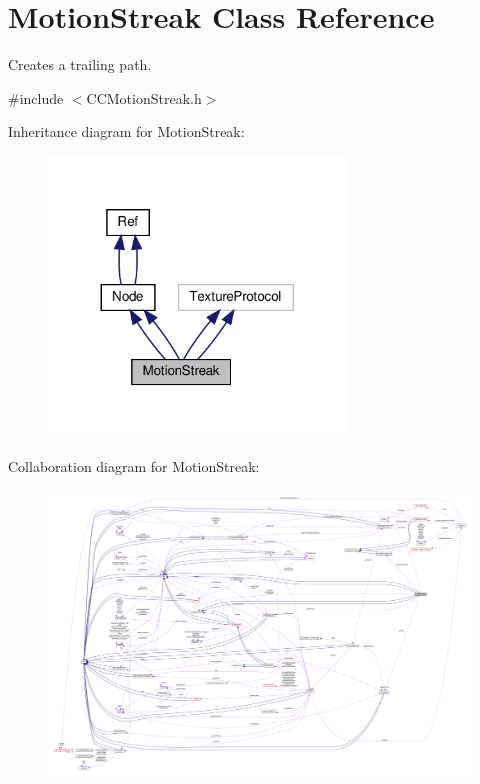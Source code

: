 \hypertarget{classMotionStreak}{}\section{Motion\+Streak Class Reference}
\label{classMotionStreak}


Creates a trailing path.  




{\ttfamily \#include $<$C\+C\+Motion\+Streak.\+h$>$}



Inheritance diagram for Motion\+Streak\+:
\nopagebreak
\begin{figure}[H]
\begin{center}
\leavevmode
\includegraphics[width=224pt]{classMotionStreak__inherit__graph}
\end{center}
\end{figure}


Collaboration diagram for Motion\+Streak\+:
\nopagebreak
\begin{figure}[H]
\begin{center}
\leavevmode
\includegraphics[width=350pt]{classMotionStreak__coll__graph}
\end{center}
\end{figure}
